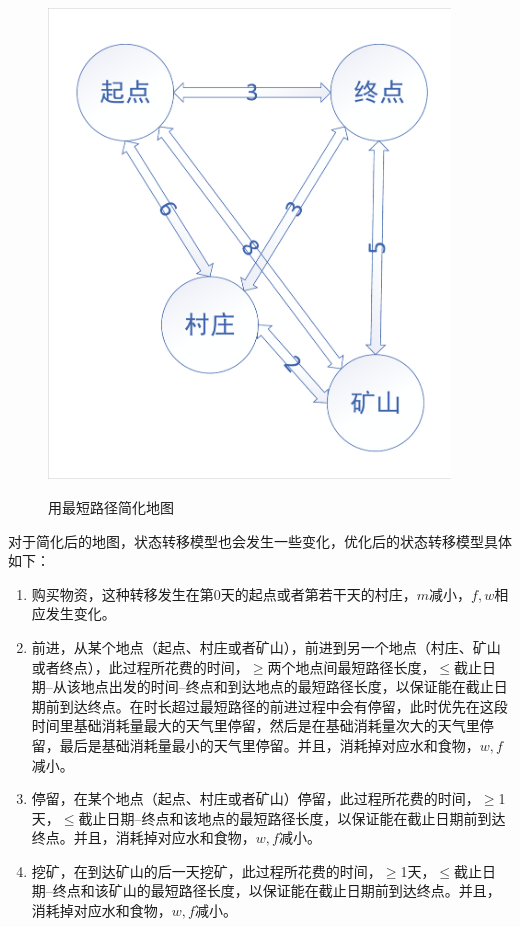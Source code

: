 \documentclass[withoutpreface,bwprint]{cumcmthesis} %
\begin{document}
\begin{figure}
\begin{minipage}[c]{0.45\textwidth}
        \includegraphics[width=0.95\textwidth]{figures/jianhua.pdf}
        \label{jianhua}
    \end{minipage}
    \caption{用最短路径简化地图}
    \label{jianhuaguocheng}
\end{figure}

对于简化后的地图，状态转移模型也会发生一些变化，优化后的状态转移模型具体如下：

\begin{enumerate}
    \item 购买物资，这种转移发生在第0天的起点或者第若干天的村庄，\(m\)减小，\(f,w\)相应发生变化。
    \item 前进，从某个地点（起点、村庄或者矿山），前进到另一个地点（村庄、矿山或者终点），此过程所花费的时间，\(\geq\)两个地点间最短路径长度，\(\leq\)截止日期--从该地点出发的时间--终点和到达地点的最短路径长度，以保证能在截止日期前到达终点。在时长超过最短路径的前进过程中会有停留，此时优先在这段时间里基础消耗量最大的天气里停留，然后是在基础消耗量次大的天气里停留，最后是基础消耗量最小的天气里停留。并且，消耗掉对应水和食物，\(w,f\)减小。
    \item 停留，在某个地点（起点、村庄或者矿山）停留，此过程所花费的时间，\(\geq\)1天，\(\leq\)截止日期--终点和该地点的最短路径长度，以保证能在截止日期前到达终点。并且，消耗掉对应水和食物，\(w,f\)减小。
    \item 挖矿，在到达矿山的后一天挖矿，此过程所花费的时间，\(\geq\)1天，\(\leq\)截止日期--终点和该矿山的最短路径长度，以保证能在截止日期前到达终点。并且，消耗掉对应水和食物，\(w,f\)减小。
\end{enumerate}
\end{document}
